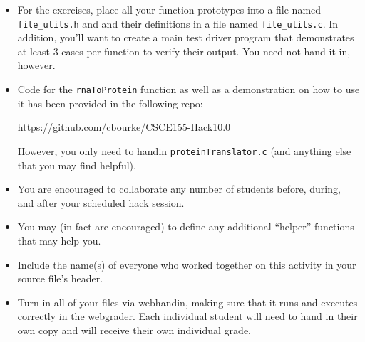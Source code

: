 \documentclass[12pt]{scrartcl}
\begin{document}
\begin{itemize}

  \item For the exercises, place all your function prototypes into a file 
  named \texttt{file_utils.h} and and their definitions in a
  file named \texttt{file_utils.c}.  In addition, you'll want
  to create a main test driver program that demonstrates at least 3 cases 
  per function to verify their output.  You need not hand it in, however.
  
  \item Code for the \texttt{rnaToProtein} function as well as 
  a demonstration on how to use it has been provided in the following repo:

  \url{https://github.com/cbourke/CSCE155-Hack10.0}

  However, you only need to handin \texttt{proteinTranslator.c}
  (and anything else that you may find helpful).

  \item You are encouraged to collaborate any number of students 
  before, during, and after your scheduled hack session.  

  \item You may (in fact are encouraged) to define any additional
  ``helper'' functions that may help you.

  \item Include the name(s) of everyone who worked together on
  this activity in your source file's header.

  \item Turn in all of your files via webhandin, making sure that 
  it runs and executes correctly in the webgrader.  Each individual 
  student will need to hand in their own copy and will receive 
  their own individual grade.
\end{itemize}  
\end{document}
